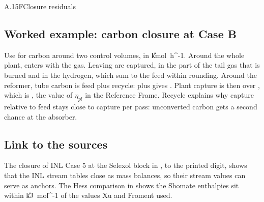 \begin{eqcard}{A.15}{F}{Closure residuals}
\end{eqcard}

\subsection*{Worked example: carbon closure at Case B}
Use  for carbon around two control volumes, in \U{kmol\ h^{-1}}. Around the whole plant, \cFeedC{} enters with the gas. Leaving are \cCapC{} captured, \cBurnC{} in the part of the tail gas that is burned and \cProdC{} in the hydrogen, which sum to the feed within rounding. Around the reformer, tube carbon is feed plus recycle: \cFeedC{} plus \cRecyC{} gives \cTubeC. Plant capture is then \cCapC{} over \cFeedC, which is \vEtaPl, the value of $\eta_{pl}$ in the Reference Frame. Recycle explains why capture relative to feed stays close to capture per pass: unconverted carbon gets a second chance at the absorber.

\subsection*{Link to the sources}
The closure of INL Case 5 at the Selexol block in , to the printed digit, shows that the INL stream tables close as mass balances, so their stream values can serve as anchors. The Hess comparison in  shows the Shomate enthalpies sit within \cDhGapMax{} \U{kJ\ mol^{-1}} of the values Xu and Froment used.
